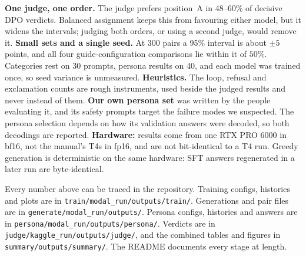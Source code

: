 \documentclass{article}
\begin{document}
\textbf{One judge, one order.} The judge prefers position~A in 48--60\% of decisive DPO verdicts. Balanced assignment
keeps this from favouring either model, but it widens the intervals; judging both orders, or using a second judge,
would remove it. \textbf{Small sets and a single seed.} At 300 pairs a 95\% interval is about $\pm5$ points, and all
four guide-configuration comparisons lie within it of $50\%$. Categories rest on 30 prompts, persona results on 40,
and each model was trained once, so seed variance is unmeasured. \textbf{Heuristics.} The loop, refusal and
exclamation counts are rough instruments, used beside the judged results and never instead of them. \textbf{Our own
persona set} was written by the people evaluating it, and its safety prompts target the failure modes we suspected.
The persona selection depends on how its validation answers were decoded, so both decodings are reported.
\textbf{Hardware:} results come from one RTX PRO 6000 in bf16, not the manual's T4s in fp16, and are not bit-identical
to a T4 run. Greedy generation is deterministic on the same hardware: SFT answers regenerated in a later run are
byte-identical.

Every number above can be traced in the repository. Training configs, histories and plots are in
\texttt{train/modal\_run/outputs/train/}. Generations and pair files are in \texttt{generate/modal\_run/outputs/}.
Persona configs, histories and answers are in \texttt{persona/modal\_run/outputs/persona/}. Verdicts are in
\texttt{judge/kaggle\_run/outputs/judge/}, and the combined tables and figures in
\texttt{summary/outputs/summary/}. The README documents every stage at length.



\end{document}
